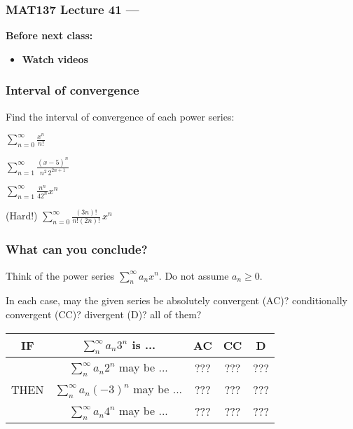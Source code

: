 \documentclass[14pt]{beamer}
\date{}
\title{}
\author{}
\newcommand{\p}{\pause}
\newcommand{\setsize}[1]{\fontsize{#1}{#1}\selectfont} %
\newcommand{\smallerfont}{\setsize{13}} %
\newcommand{\vv}{\vspace{.5cm}}
\newcommand{\fantasma}{\phantom{${\displaystyle \frac{1}{1}}$}}
\newcommand{\tasma}{\fantasma ??? \fantasma}
\begin{document}
\begin{frame}
	\frametitle{MAT137 Lecture 41 --- }

	\vfill
	{\bf Before next class:}
		\begin{itemize} \normalsize
			\item {\bf Watch videos}
		\end{itemize}
\end{frame}

	\begin{frame}[t]
		\frametitle{Interval of convergence}

		Find the interval of convergence of each power series:

		\begin{enumerate}
		\end{enumerate}
	\end{frame}
	\begin{frame}[t]
		\smallerfont
		\frametitle{What can you conclude?}

		Think of the power series ${\displaystyle \sum_{n}^{\infty} a_nx^n}$. Do not
		assume $a_{n} \geq0$.

		In each case, may the given series be absolutely convergent (AC)? conditionally
		convergent (CC)? divergent (D)? all of them?

		\begin{center}
			\begin{tabular}{c|c|c|c|c|}
				\hline
				IF               & ${\displaystyle \sum_{n}^{\infty} a_n 3^n}$ is ...        & AC     & CC     & D      \\
				\hline
				\hline
				                 & ${\displaystyle \sum_{n}^{\infty} a_n 2^n}$ may be ...    & \tasma & \tasma & \tasma \\
				\cline{2-5} THEN & ${\displaystyle \sum_{n}^{\infty} a_n (-3)^n}$ may be ... & \tasma & \tasma & \tasma \\
				\cline{2-5}      & ${\displaystyle \sum_{n}^{\infty} a_n 4^n}$ may be ...    & \tasma & \tasma & \tasma \\
				\hline
			\end{tabular}
		\end{center}
	\end{frame}
\end{document}
